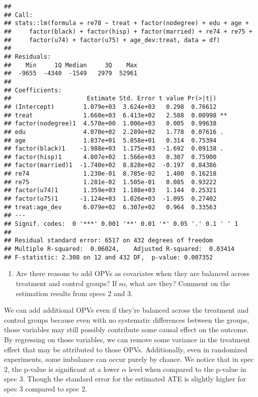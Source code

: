 \documentclass[
]{article}
\providecommand{\tightlist}{%
  \setlength{\itemsep}{0pt}\setlength{\parskip}{0pt}}
\begin{document}
\begin{verbatim}
## 
## Call:
## stats::lm(formula = re78 ~ treat + factor(nodegree) + edu + age + 
##     factor(black) + factor(hisp) + factor(married) + re74 + re75 + 
##     factor(u74) + factor(u75) + age_dev:treat, data = df)
## 
## Residuals:
##    Min     1Q Median     3Q    Max 
##  -9655  -4340  -1549   2979  52961 
## 
## Coefficients:
##                     Estimate Std. Error t value Pr(>|t|)   
## (Intercept)        1.079e+03  3.624e+03   0.298  0.76612   
## treat              1.660e+03  6.413e+02   2.588  0.00998 **
## factor(nodegree)1  4.570e+00  1.006e+03   0.005  0.99638   
## edu                4.070e+02  2.289e+02   1.778  0.07616 . 
## age                1.837e+01  5.858e+01   0.314  0.75394   
## factor(black)1    -1.988e+03  1.175e+03  -1.692  0.09138 . 
## factor(hisp)1      4.807e+02  1.566e+03   0.307  0.75900   
## factor(married)1  -1.740e+02  8.828e+02  -0.197  0.84386   
## re74               1.230e-01  8.785e-02   1.400  0.16218   
## re75               1.281e-02  1.505e-01   0.085  0.93222   
## factor(u74)1       1.359e+03  1.188e+03   1.144  0.25321   
## factor(u75)1      -1.124e+03  1.026e+03  -1.095  0.27402   
## treat:age_dev      6.079e+02  6.307e+02   0.964  0.33563   
## ---
## Signif. codes:  0 '***' 0.001 '**' 0.01 '*' 0.05 '.' 0.1 ' ' 1
## 
## Residual standard error: 6517 on 432 degrees of freedom
## Multiple R-squared:  0.06024,    Adjusted R-squared:  0.03414 
## F-statistic: 2.308 on 12 and 432 DF,  p-value: 0.007352
\end{verbatim}

\begin{enumerate}
\def\labelenumi{\alph{enumi}.}
\setcounter{enumi}{1}
\tightlist
\item
  Are there reasons to add OPVs as covariates when they are balanced
  across treatment and control groups? If so, what are they? Comment on
  the estimation results from specs 2 and 3.
\end{enumerate}

We can add additional OPVs even if they're balanced across the treatment
and control groups because even with no systematic differences between
the groups, those variables may still possibly contribute some causal
effect on the outcome. By regressing on those variables, we can remove
some variance in the treatment effect that may be attributed to those
OPVs. Additionally, even in randomized experiments, some imbalance can
occur purely by chance. We notice that in spec 2, the p-value is
significant at a lower \(\alpha\) level when compared to the p-value in
spec 3. Though the standard error for the estimated ATE is slightly
higher for spec 3 compared to spec 2.
\end{document}
